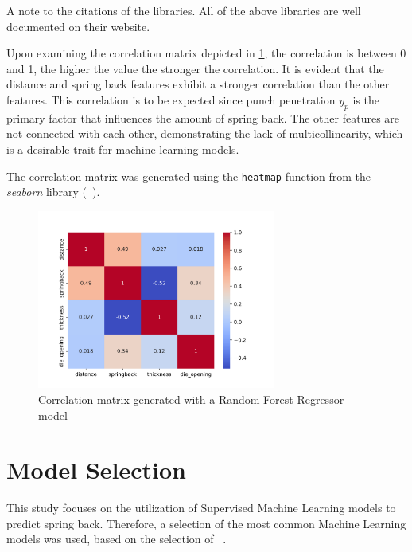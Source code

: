 A note to the citations of the libraries.
All of the above libraries are well documented on their website.

Upon examining the correlation matrix depicted in \cref{fig:correlation_matrix}, the correlation is between 0 and 1,
the higher the value the stronger the correlation.
It is evident that the distance and spring back features exhibit a stronger correlation
than the other features.
This correlation is to be expected since punch penetration $y_p$ is the primary factor
that influences the amount of spring back.
The other features are not connected with each other, demonstrating the lack of multicollinearity, which is a
desirable trait for machine learning models.

The correlation matrix was generated using the \texttt{heatmap} function from the \textit{seaborn} library
(~\cite{Waskom2021}).

\begin{figure}[H]
    \begin{tcolorbox}[arc=0pt,boxrule=0.5pt]
        \centering
        \includegraphics[width=0.7\textwidth]{chap4/images/correlation_matrix}
    \end{tcolorbox}
    \caption{Correlation matrix generated with a Random Forest Regressor model}
    \label{fig:correlation_matrix}
\end{figure}


\section{Model Selection}\label{sec:model-selection}
This study focuses on the utilization of Supervised Machine Learning models to predict
spring back.
Therefore, a selection of the most common Machine Learning models was used, based on
the selection of ~\cite{muller2016introduction}.

